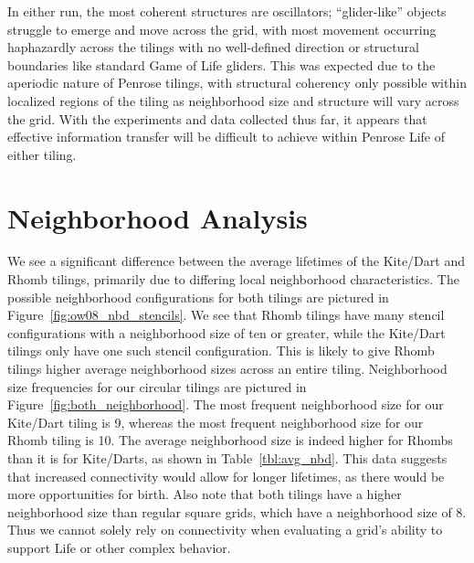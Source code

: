 \documentclass[a4paper,11pt]{report}
\begin{document}
In either run, the most coherent structures are oscillators; ``glider-like'' objects struggle to emerge and move across the grid, with most movement occurring haphazardly across the tilings with no well-defined direction or structural boundaries like standard Game of Life gliders. This was expected due to the aperiodic nature of Penrose tilings, with structural coherency only possible within localized regions of the tiling as neighborhood size and structure will vary across the grid. With the experiments and data collected thus far, it appears that effective information transfer will be difficult to achieve within Penrose Life of either tiling.

\section{Neighborhood Analysis}
\label{sec:ch4_neighbors}

We see a significant difference between the average lifetimes of the Kite/Dart and Rhomb tilings, primarily due to differing local neighborhood characteristics. The possible neighborhood configurations for both tilings are pictured in Figure~\ref{fig:ow08_nbd_stencils}. We see that Rhomb tilings have many stencil configurations with a neighborhood size of ten or greater, while the Kite/Dart tilings only have one such stencil configuration. This is likely to give Rhomb tilings higher average neighborhood sizes across an entire tiling. Neighborhood size frequencies for our circular tilings are pictured in Figure~\ref{fig:both_neighborhood}. The most frequent neighborhood size for our Kite/Dart tiling is 9, whereas the most frequent neighborhood size for our Rhomb tiling is 10. The average neighborhood size is indeed higher for Rhombs than it is for Kite/Darts, as shown in Table~\ref{tbl:avg_nbd}. This data suggests that increased connectivity would allow for longer lifetimes, as there would be more opportunities for birth. Also note that both tilings have a higher neighborhood size than regular square grids, which have a neighborhood size of 8. Thus we cannot solely rely on connectivity when evaluating a grid's ability to support Life or other complex behavior. 
\end{document}
